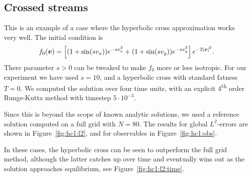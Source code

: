 \clearpage

\subsection{Crossed streams} \label{sec:crossed}

This is an example of a case where the hyperbolic cross approximation works
very well. The initial condition is 
\[
    f_0({\bm v}) = \left[(1+\sin(sv_x))e^{-sv_x^2} + 
            (1+\sin(sv_y))e^{-sv_y^2}\right] e^{-2|{\bm v}|^2}.
\]
There parameter $s>0$ can be tweaked to make $f_0$ more or less isotropic.  For
our experiment we have used $s=10$, and a hyperbolic cross with standard
fatness $T=0$.  We computed the solution over four time units, with an explicit
4\textsuperscript{th} order Runge-Kutta method with timestep $5\cdot10^{-3}$.

Since this is beyond the scope of known analytic solutions, we used a reference
solution computed on a full grid with $N=80$. The results for global
$L^2$-errors are shown in Figure~\vref{fig:hc1:l2}, and for observables in
Figure~\vref{fig:hc1:obs}.

In these cases, the hyperbolic cross can be seen to outperform the full grid
method, although the latter catches up over time and eventually wins out as the
solution approaches equilibrium, see Figure~\vref{fig:hc1:l2:time}.

